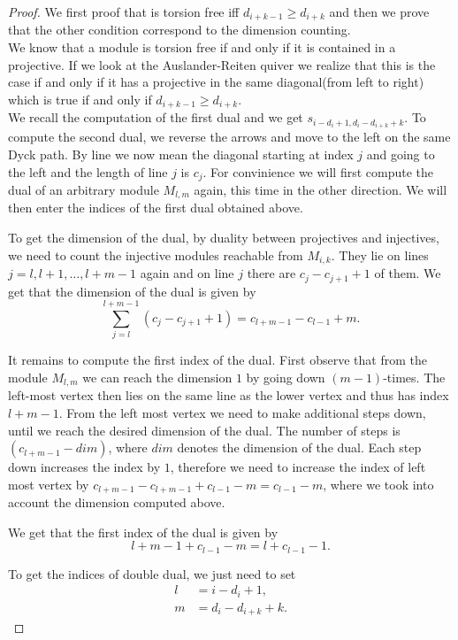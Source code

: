 \documentclass[12pt, a4paper]{article}
\numberwithin{equation}{section}
\theoremstyle{definition}
\theoremstyle{plain}
\theoremstyle{remark}
\begin{document}
\begin{proof}
We first proof that is torsion free iff $d_{i+k-1}\geq d_{i+k}$ and then we prove that
the other condition correspond to the dimension counting.\\
We know that a module is torsion free if and only if it is contained
in a projective. If we look at the Auslander-Reiten quiver we realize that
this is the case if and only if it has a projective in the same diagonal(from left to right) which 
is true if and only if $d_{i+k-1}\geq d_{i+k}$.\\
We recall the computation of the first dual and we get $s_{i-d_i+1,d_i-d_{i+k}+k}$. 
To compute the second dual, we reverse the arrows and move to the left on the same Dyck path. By line we now mean the diagonal starting at index $j$ and going to the left and the length of line $j$ is $c_j$.
For convinience we will first compute the dual of an arbitrary module $M_{l,m}$ again, this time in the other direction. We will then enter the indices of the first dual obtained above.

To get the dimension of the dual, by duality between projectives and injectives, we need to count the injective modules reachable from $M_{i,k}$.
They lie on lines $j = l, l+1, \dots, l+m-1$ again and on line $j$ there are $c_j - c_{j+1} + 1$ of them.
We get that the dimension of the dual is given by
\begin{equation}
\label{eq:injectives}      
\sum_{j=l}^{l+m-1} (c_j - c_{j+1} + 1) = c_{l+m-1} - c_{l-1} + m.
\end{equation}

It remains to compute the first index of the dual.
First observe that from the module $M_{l,m}$ we can reach the dimension $1$ by going down $(m - 1)$-times. The left-most vertex then lies on the same line as the lower vertex and thus has index $l + m - 1$.
From the left most vertex we need to make additional steps down, until we reach the desired dimension of the dual.
The number of steps is $(c_{l+m-1} - dim)$, where $dim$ denotes the dimension of the dual.
Each step down increases the index by $1$, therefore we need to increase the index of left most vertex by $c_{l+m-1} - c_{l+m-1} + c_{l-1} - m = c_{l-1} - m$, where we took into account the dimension computed above.

We get that the first index of the dual is given by 
$$l + m - 1 + c_{l-1} - m = l + c_{l-1} - 1.$$

To get the indices of double dual, we just need to set 
\begin{align*}
    l &= i - d_i + 1, \\
    m &= d_i - d_{i+k} + k.
\end{align*}


\end{proof}
\end{document}
